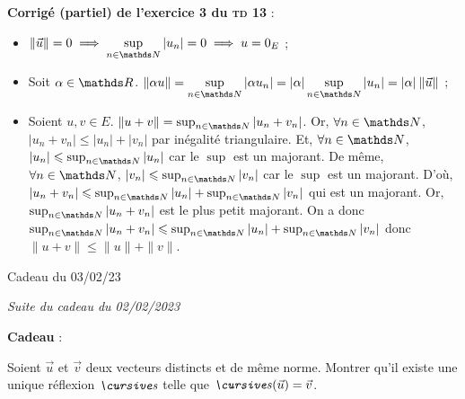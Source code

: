 \documentclass[a4paper]{article}
\begin{document}
	\bigskip
	\bigskip
	\textbf{Corrigé (partiel) de l'exercice 3 du \textsc{td} 13} :\\
	\begin{itemize}
		\item $\ds\|\vec{u}\| = 0 \implies \sup_{n \in \N} |u_n| = 0 \implies u = 0_E$\/ ;
		\item Soit $\alpha \in \R$. $\ds\|\alpha u\| = \sup_{n \in \N} |\alpha u_n| = |\alpha| \sup_{n \in \N} |u_n| = |\alpha|\:\|\vec{u}\|$\/ ;
		\item Soient $u,v \in E$. $\|u + v\| = \sup_{n \in \N} |u_n + v_n|$.
			Or, $\forall n \in \N$, $|u_n + v_n| \le |u_n| + |v_n|$\/ par inégalité triangulaire.
			Et, $\forall n \in \N$, $|u_n| \le \sup_{n \in \N} |u_n|$\/ car le $\sup$\/ est un majorant.
			De même, $\forall n \in \N$, $|v_n| \le \sup_{n \in \N} |v_n|$\/ car le $\sup$\/ est un majorant.
			D'où, $|u_n + v_n| \le \sup_{n \in \N} |u_n| + \sup_{n \in \N} |v_n|$\/ qui est un majorant.
			Or, $\sup_{n \in \N} |u_n + v_n|$\/ est le plus petit majorant.
			On a donc $\sup_{n \in \N} |u_n + v_n| \le \sup_{n \in \N} |u_n| + \sup_{n \in \N} |v_n|$\/ donc $\|u + v\| \le \|u\| + \|v\|$.
	\end{itemize}

	\clearpage
	\centerline{\LARGE Cadeau du 03/02/23}
	\centerline{\textit{Suite du cadeau du 02/02/2023}}

	\bigskip
	\bigskip
	\bigskip
	\textbf{Cadeau} :\\
	\begin{slshape}
		Soient $\vec{u}$\/ et $\vec{v}$\/ deux vecteurs distincts et de même norme. Montrer qu'il existe une unique réflexion $\s$ telle que $\s(\vec{u}) = \vec{v}$.
	\end{slshape}
\end{document}
